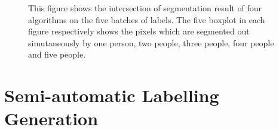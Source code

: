 \documentclass[runningheads,a4paper]{llncs}
\begin{document}
\begin{figure}[!tb]
\centering
{}
\caption{ This figure shows the intersection of segmentation result of four algorithms on the five batches of labels. The five boxplot in each figure respectively shows the pixels which are segmented out simutaneously by one person, two people, three people, four people and five people.}
\label{fig:seg-inter}
\end{figure}


\section{Semi-automatic Labelling Generation}
\end{document}

